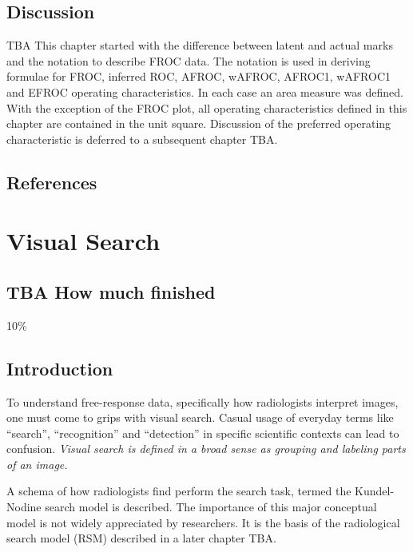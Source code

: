 \documentclass[
]{book}
\begin{document}
\hypertarget{froc-empirical-Discussion}{%
\section{Discussion}\label{froc-empirical-Discussion}}

TBA This chapter started with the difference between latent and actual marks and the notation to describe FROC data. The notation is used in deriving formulae for FROC, inferred ROC, AFROC, wAFROC, AFROC1, wAFROC1 and EFROC operating characteristics. In each case an area measure was defined. With the exception of the FROC plot, all operating characteristics defined in this chapter are contained in the unit square. Discussion of the preferred operating characteristic is deferred to a subsequent chapter TBA.

\hypertarget{froc-empirical-references}{%
\section{References}\label{froc-empirical-references}}

\hypertarget{visual-search}{%
\chapter{Visual Search}\label{visual-search}}

\hypertarget{visual-search-how-much-finished}{%
\section{TBA How much finished}\label{visual-search-how-much-finished}}

10\%

\hypertarget{visual-search-intro}{%
\section{Introduction}\label{visual-search-intro}}

To understand free-response data, specifically how radiologists interpret images, one must come to grips with visual search. Casual usage of everyday terms like ``search'', ``recognition'' and ``detection'' in specific scientific contexts can lead to confusion.
\emph{Visual search is defined in a broad sense as grouping and labeling parts of an image.}

A schema of how radiologists find perform the search task, termed the Kundel-Nodine search model is described. The importance of this major conceptual model is not widely appreciated by researchers. It is the basis of the radiological search model (RSM) described in a later chapter TBA.
\end{document}
